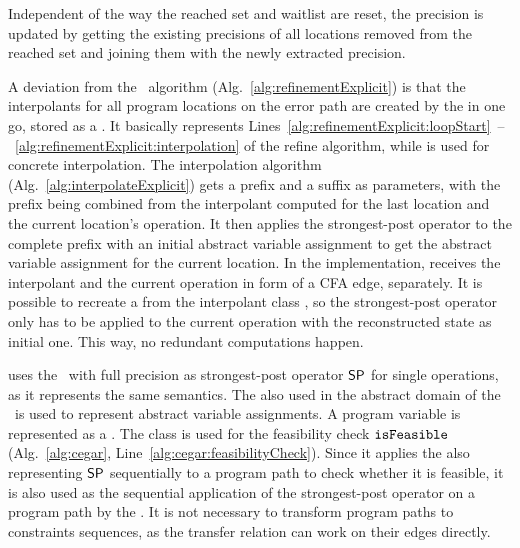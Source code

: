 Independent of the way the reached set and waitlist are reset, the precision is updated by getting the existing precisions of all locations removed from the reached set and joining them with the newly extracted precision.

A deviation from the \ algorithm (Alg.~\ref{alg:refinementExplicit}) is that the interpolants for all program locations on the error path are created by the  in one go, stored as a .
It basically represents Lines~\ref{alg:refinementExplicit:loopStart}~--~\ref{alg:refinementExplicit:interpolation} of the refine algorithm, while  is used for concrete interpolation.
The interpolation algorithm (Alg.~\ref{alg:interpolateExplicit}) gets a prefix and a suffix as parameters, with the prefix being combined from the interpolant computed for the last location and the current location's operation. It then applies the strongest-post operator to the complete prefix with an initial abstract variable assignment to get the abstract variable assignment for the current location.
In the implementation,  receives the interpolant and the current operation in form of a CFA edge, separately.
It is possible to recreate a  from the interpolant class , so the strongest-post operator only has to be applied to the current operation with the reconstructed state as initial one. This way, no redundant computations happen.

 uses the \ with full precision as strongest-post operator $\operatorname{\operatorname{\operatorname{\mathsf{SP}}}}$ for single operations, as it represents the same semantics. The  also used in the abstract domain of the \ is used to represent abstract variable assignments. A program variable is represented as a .
The class  is used for the feasibility check $\texttt{isFeasible}$ (Alg.~\ref{alg:cegar}, Line~\ref{alg:cegar:feasibilityCheck}).
Since it applies the  also representing $\operatorname{\operatorname{\operatorname{\mathsf{SP}}}}$ sequentially to a program path to check whether it is feasible, it is also used as the sequential application of the strongest-post operator on a program path by the  .
It is not necessary to transform program paths to constraints sequences, as the transfer relation can work on their edges directly.

